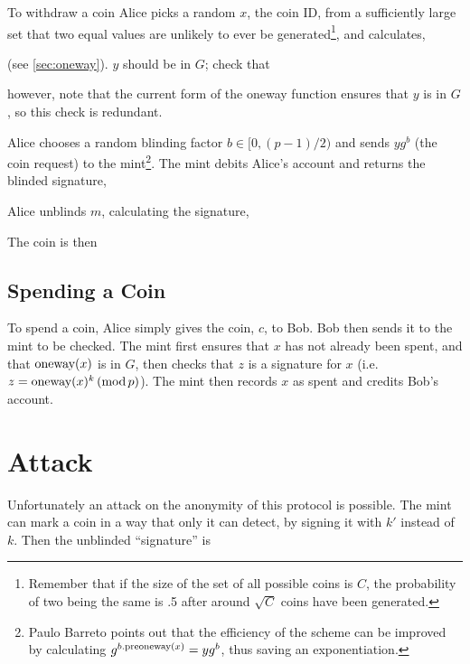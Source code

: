 \documentclass[a4paper,titlepage]{article}
\begin{document}
To withdraw a coin Alice picks a random $x$, the coin ID, from a
sufficiently large set that two equal values are unlikely to ever be
generated\footnote{Remember that if the size of the set of all
possible coins is $C$, the probability of two being the same is .5
after around $\sqrt{C}$ coins have been generated.}, and calculates,


(see \ref{sec:oneway}). $y$ should be in $G$; check that


however, note that the current form of the oneway function ensures
that $y$ is in $G$, so this check is redundant.

Alice chooses a random blinding factor $b \in [0,(p-1)/2)$ and sends
$y g^b$ (the coin request) to the mint\footnote{Paulo Barreto points
out that the efficiency of the scheme can be improved by calculating
$g^{b.\textrm{preoneway}(x)}=y g^b$, thus saving an exponentiation.}. The mint
debits Alice's account and returns the blinded signature,


Alice unblinds $m$, calculating the signature,


The coin is then


\subsection{Spending a Coin}

To spend a coin, Alice simply gives the coin, $c$, to Bob. Bob then
sends it to the mint to be checked. The mint first ensures that $x$
has not already been spent, and that $\textrm{oneway}(x)$ is in $G$, then checks that
$z$ is a signature for $x$ (i.e. $z=\textrm{oneway}(x)^k \,(\textrm{mod}\,p)$). The mint
then records $x$ as spent and credits Bob's account.

\section{Attack}

Unfortunately an attack on the anonymity of this protocol is
possible. The mint can mark a coin in a way that only it can detect,
by signing it with $k'$ instead of $k$. Then the unblinded
``signature'' is

\end{document}
